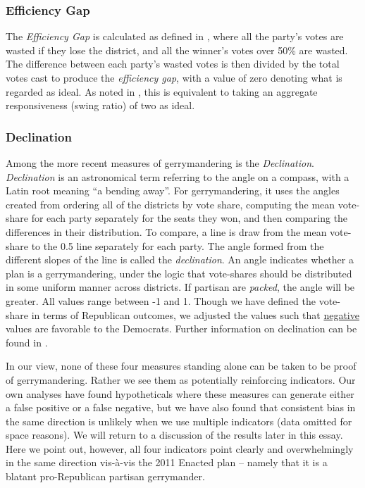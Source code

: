             \subsubsection*{Efficiency Gap}
    The \textit{Efficiency Gap} is calculated as defined in \citet{Stephanopoulos2014_UofChicagoLaw}, where all the party’s votes are wasted if they lose the district, and all the winner’s votes over 50\% are wasted. The difference between each party’s wasted votes is then divided by the total votes cast to produce the \textit{efficiency gap}, with a value of zero denoting what is regarded as ideal. As noted in \citet[][p. 13]{Best2018}, this is equivalent to taking an aggregate responsiveness (swing ratio) of two as ideal. 
\par
            \subsubsection*{Declination}
    Among the more recent measures of gerrymandering is the \textit{Declination}. \textit{Declination} is an astronomical term referring to the angle on a compass, with a Latin root meaning ``a bending away''. For gerrymandering, it uses the angles created from ordering all of the districts by vote share, computing the mean vote-share for each party separately for the seats they won, and then comparing the differences in their distribution. To compare, a line is draw from the mean vote-share to the 0.5 line separately for each party. The angle formed from the different slopes of the line is called the \textit{declination}. An angle indicates whether a plan is a gerrymandering, under the logic that vote-shares should be distributed in some uniform manner across districts. If partisan are \textit{packed}, the angle will be greater. All values range between -1 and 1. Though we have defined the vote-share in terms of Republican outcomes, we adjusted the values such that \underline{negative} values are favorable to the Democrats. Further information on declination can be found in \citet{Warrington2018}.  
\par
    In our view, none of these four measures standing alone can be taken to be proof of gerrymandering. Rather we see them as potentially reinforcing indicators. Our own analyses have found hypotheticals where these measures can generate either a false positive or a false negative, but we have also found that consistent bias in the same direction is unlikely when we use multiple indicators (data omitted for space reasons). We will return to a discussion of the results later in this essay. Here we point out, however, all four indicators point clearly and overwhelmingly in the same direction vis-à-vis the 2011 Enacted plan -- namely that it is a blatant pro-Republican partisan gerrymander.
\par
